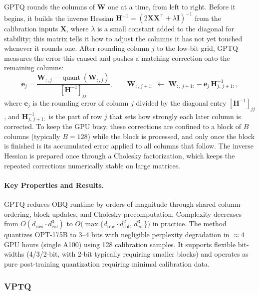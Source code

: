 GPTQ rounds the columns of $\bm{W}$ one at a time, from left to right. Before it begins, it builds the inverse Hessian $\bm{H}^{-1}=(2\bm{X}\bm{X}^\top+\lambda\bm{I})^{-1}$ from the calibration inputs $\bm{X}$, where $\lambda$ is a small constant added to the diagonal for stability; this matrix tells it how to adjust the columns it has not yet touched whenever it rounds one. After rounding column $j$ to the low-bit grid, GPTQ measures the error this caused and pushes a matching correction onto the remaining columns:
\begin{equation}
  \bm{e}_j = \frac{\bm{W}_{:,j} - \operatorname{quant}(\bm{W}_{:,j})}{[\bm{H}^{-1}]_{jj}},
  \qquad
  \bm{W}_{:,\,j+1:} \;\leftarrow\; \bm{W}_{:,\,j+1:} - \bm{e}_j\,\bm{H}^{-1}_{j,\,j+1:},
  \label{eq:gptq_update}
\end{equation}
where $\bm{e}_j$ is the rounding error of column $j$ divided by the diagonal entry $[\bm{H}^{-1}]_{jj}$, and $\bm{H}^{-1}_{j,\,j+1:}$ is the part of row $j$ that sets how strongly each later column is corrected. To keep the GPU busy, these corrections are confined to a block of $B$ columns (typically $B = 128$) while the block is processed, and only once the block is finished is its accumulated error applied to all columns that follow. The inverse Hessian is prepared once through a Cholesky factorization, which keeps the repeated corrections numerically stable on large matrices.

\paragraph{Key Properties and Results.}
GPTQ reduces OBQ runtime by orders of magnitude through shared column ordering, block updates, and Cholesky precomputation. Complexity decreases from $O(d_{\text{row}}\cdot d_{\text{col}}^{3})$ to $O\!\big(\max\{d_{\text{row}}\cdot d_{\text{col}}^{2},\, d_{\text{col}}^{3}\}\big)$ in practice. The method quantizes OPT-175B to 3–4 bits with negligible perplexity degradation in $\approx 4 $  GPU hours (single A100) using 128 calibration samples. It supports flexible bit-widths (4/3/2-bit, with 2-bit typically requiring smaller blocks) and operates as pure post-training quantization requiring minimal calibration data.

\subsubsection{VPTQ \cite{liu2024vptq}}


